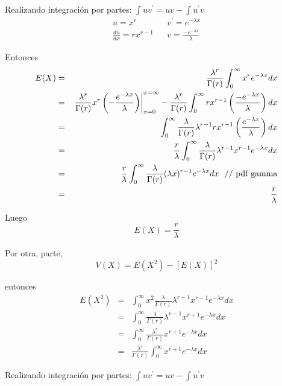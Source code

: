 \begin{i}
Realizando integración por partes: $\int uv^{\prime }=uv-\int u^{\prime}v$
\begin{equation*}
\begin{array}{ccc}
u=x^{r} &  & v^{\prime }=e^{-\lambda x} \\ 
\frac{du}{dx}=rx^{r-1} &  & v=\frac{-e^{-\lambda x}}{\lambda }
\end{array}
\end{equation*}

Entonces
\begin{eqnarray*}
E(X) &=&\frac{\lambda ^{r}}{\Gamma (r)}\int_{0}^{\infty }x^{r}e^{-\lambda
x}dx \\
&=&\left. \frac{\lambda ^{r}}{\Gamma (r)}x^{r}\left( -\frac{e^{-\lambda x}}{%
\lambda }\right) \right\vert _{x=0}^{x=\infty }-\frac{\lambda ^{r}}{\Gamma
(r)}\int_{0}^{\infty }rx^{r-1}\left( \frac{-e^{-\lambda x}}{\lambda }\right)
dx \\
&=&\int_{0}^{\infty }\frac{\lambda }{\Gamma (r)}\lambda ^{r-1}rx^{r-1}\left( 
\frac{e^{-\lambda x}}{\lambda }\right) dx \\
&=&\frac{r}{\lambda }\int_{0}^{\infty }\frac{\lambda }{\Gamma (r)}\lambda
^{r-1}x^{r-1}e^{-\lambda x}dx \\
&=&\frac{r}{\lambda }\int_{0}^{\infty }\frac{\lambda }{\Gamma (r)}(\lambda
x)^{r-1}e^{-\lambda x}dx\text{ \ // pdf gamma} \\
&=&\frac{r}{\lambda }
\end{eqnarray*}

Luego
\begin{equation*}
E(X)=\frac{r}{\lambda }
\end{equation*}

Por otra, parte, 
\begin{equation*}
V(X)=E(X^{2})-[E(X)]^{2}
\end{equation*}

entonces
\begin{eqnarray*}
E(X^{2}) &=&\int_{0}^{\infty }x^{2}\frac{\lambda }{\Gamma (r)}\lambda
^{r-1}x^{r-1}e^{-\lambda x}dx \\
&=&\int_{0}^{\infty }\frac{\lambda }{\Gamma (r)}\lambda
^{r-1}x^{r+1}e^{-\lambda x}dx \\
&=&\int_{0}^{\infty }\frac{\lambda ^{r}}{\Gamma (r)}x^{r+1}e^{-\lambda x}dx
\\
&=&\frac{\lambda ^{r}}{\Gamma (r)}\int_{0}^{\infty }x^{r+1}e^{-\lambda x}dx
\end{eqnarray*}

Realizando integración por partes: $\int uv^{\prime }=uv-\int u^{\prime}v$


\end{i}
